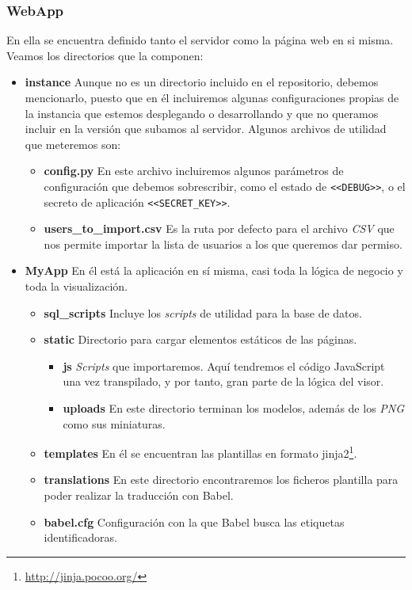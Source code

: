 \subsubsection{WebApp}
En ella se encuentra definido tanto el servidor como la página web en si misma. Veamos los directorios que la componen:
\begin{itemize}
	\item \textbf{instance} Aunque no es un directorio incluido en el repositorio, debemos mencionarlo, puesto que en él incluiremos algunas configuraciones propias de la instancia que estemos desplegando o desarrollando y que no queramos incluir en la versión que subamos al servidor. Algunos archivos de utilidad que meteremos son:
		\begin{itemize}
			\item \textbf{config.py} En este archivo incluiremos algunos parámetros de configuración que debemos sobrescribir, como el estado de \texttt{<<DEBUG>>}, o el secreto de aplicación \texttt{<<SECRET\_KEY>>}.
			\item \textbf{users\_to\_import.csv} Es la ruta por defecto para el archivo \textit{CSV} que nos permite importar la lista de usuarios a los que queremos dar permiso.
		\end{itemize}
	\item \textbf{MyApp} En él está la aplicación en sí misma, casi toda la lógica de negocio y toda la visualización.
		\begin{itemize}
			\item \textbf{sql\_scripts} Incluye los \textit{scripts} de utilidad para la base de datos.
			\item \textbf{static} Directorio para cargar elementos estáticos de las páginas.
			\begin{itemize}
				\item \textbf{js} \textit{Scripts} que importaremos. Aquí tendremos el código JavaScript una vez transpilado, y por tanto, gran parte de la lógica del visor.
				\item \textbf{uploads} En este directorio terminan los modelos, además de los \textit{PNG} como sus miniaturas.
			\end{itemize}
			\item \textbf{templates} En él se encuentran las plantillas en formato jinja2\footnote{\url{http://jinja.pocoo.org/}}.
			\item \textbf{translations} En este directorio encontraremos los ficheros plantilla para poder realizar la traducción con Babel.
			\item \textbf{babel.cfg} Configuración con la que Babel busca las etiquetas identificadoras.

\end{itemize}
\end{itemize}
